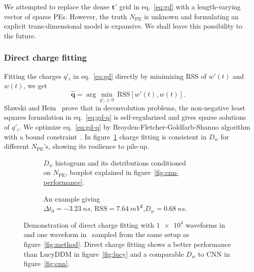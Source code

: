 We attempted to replace the dense $\bm{t'}$ grid in eq.~\eqref{eq:gd} with a length-varying vector of sparse PEs. However, the truth $N_\mathrm{PE}$ is unknown and formulating an explicit trans-dimensional model is expansive.  We shall leave this possibility to the future.

\subsubsection{Direct charge fitting}
\label{sec:dcf}

Fitting the charges $q'_i$ in eq.~\eqref{eq:gd} directly by minimizing RSS of $w'(t)$ and $w(t)$, we get
\begin{equation}
  \label{eq:gd-q}
  \bm{\hat{q}} = \arg \underset{q'_i \ge 0}{\min}~\mathrm{RSS}\left[w'(t),w(t)\right].
\end{equation}
Slawski and Hein~\cite{slawski_non-negative_2013} prove that in deconvolution problems, the non-negative least squares formulation in eq.~\eqref{eq:gd-q} is self-regularized and gives sparse solutions of $q'_i$.  We optimize eq.~\eqref{eq:gd-q} by Broyden-Fletcher-Goldfarb-Shanno algorithm with a bound constraint~\cite{byrd_limited_1995}.  In figure~\ref{fig:fitting-npe} charge fitting is consistent in $D_w$ for different $N_\mathrm{PE}$'s, showing its resilience to pile-up.

\begin{figure}[H]
  \begin{subfigure}{.5\textwidth}
    \centering
    \resizebox{\textwidth}{!}{}
    \caption{\label{fig:fitting-npe} $D_w$ histogram and its distributions conditioned \\ on $N_{\mathrm{PE}}$, boxplot explained in figure~\ref{fig:cnn-performance}.}
  \end{subfigure}
  \begin{subfigure}{.5\textwidth}
    \centering
    \resizebox{\textwidth}{!}{}
    \caption{\label{fig:fitting}An example giving \\ $\Delta{t_0}=\SI{-3.23}{ns}$, $\mathrm{RSS}=\SI{7.64}{mV^2}$,$D_w=\SI{0.68}{ns}$.}
  \end{subfigure}
  \caption{\label{fig:dcf}Demonstration of direct charge fitting with $\num[retain-unity-mantissa=false]{1e4}$ waveforms in~ and one waveform in~ sampled from the same setup as figure~\ref{fig:method}.  Direct charge fitting shows a better performance than LucyDDM in figure~\ref{fig:lucy} and a comparable $D_w$ to CNN in figure~\ref{fig:cnn}.}
\end{figure}

